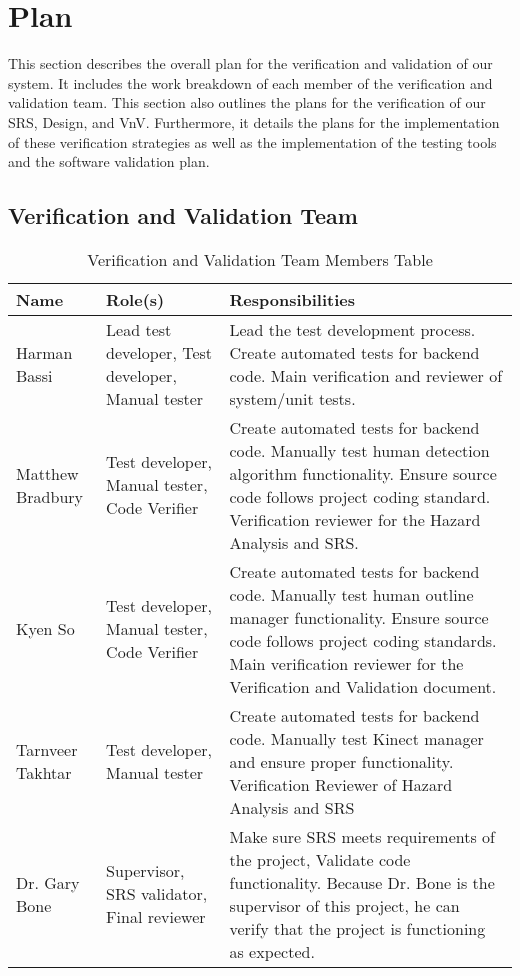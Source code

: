 \documentclass[12pt, titlepage]{article}
\begin{document}
\section{Plan}

This section describes the overall plan for the verification and validation of our system. It includes the work breakdown 
of each member of the verification and validation team. This section also outlines the plans for the verification of 
our SRS, Design, and VnV. Furthermore, it details the plans for the implementation of these verification strategies as well as 
the implementation of the testing tools and the software validation plan.

\subsection{Verification and Validation Team}

  \begin{table}[H]
  \caption{Verification and Validation Team Members Table}
  \centering
  \begin{tabular}{|l|p{1.8in}|p{2.5in}|}
  \hline
  \textbf{Name}            & \textbf{Role(s)}                                       & \textbf{Responsibilities}                                                                                                                                             \\ \hline
  Harman Bassi         & Lead test developer, Test developer, Manual tester               & Lead the test development process. Create automated tests for backend code. Main verification and reviewer of system/unit tests. \\ \hline
  Matthew Bradbury             & Test developer, Manual tester, Code Verifier       & Create automated tests for backend code. Manually test human detection algorithm functionality. Ensure source code follows project coding standard. Verification reviewer for the Hazard Analysis and SRS.                                                           \\ \hline
  Kyen So         & Test developer, Manual tester, Code Verifier                & Create automated tests for backend code. Manually test human outline manager functionality. Ensure source code follows project coding standards. Main verification reviewer for the Verification and Validation document.                                                                                               \\ \hline
  Tarnveer Takhtar            & Test developer, Manual tester        & Create automated tests for backend code. Manually test Kinect manager and ensure proper functionality. Verification Reviewer of Hazard Analysis and SRS                                       \\ \hline
  Dr. Gary Bone & Supervisor, SRS validator, Final reviewer &  Make sure SRS meets requirements of the project, Validate code functionality. Because Dr. Bone is the supervisor of this project, he can verify that the project is functioning as expected.\\ \hline
  \end{tabular}
  \end{table}
\end{document}
